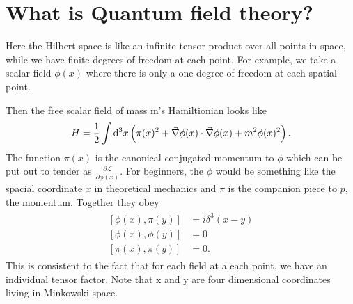 \section{What is Quantum field theory? \checkmark} \label{QFT}
	Here the Hilbert space is like an infinite tensor product over all points in space, while we have finite degrees of freedom at each point. 
For example, we take a scalar field $\phi(x)$ where there is only a one degree of freedom at each spatial point. 

	Then the free scalar field of mass m's Hamiltionian looks like
		\begin{equation}
			H=\frac{1}{2}\int \mathrm{d}^3 x \left(\pi(x)^2 + \vec{\nabla}\phi(x) \cdot \vec{\nabla}\phi(x) + m^2\phi(x)^2 \right).
		\end{equation}
	The function $\pi(x)$ is the canonical conjugated momentum to $\phi$ which can be put out to tender as $\frac{\partial \mathscr{L}}{\partial \dot{\phi}(x)}$. For beginners, the $\phi$ would be something like the spacial coordinate $x$ in theoretical mechanics and $\pi$ is the companion piece to $p$, the momentum.
	Together they obey
		\begin{align}
			\begin{split}
				[\phi(x),\pi(y)]&=i \delta^3(x-y) \\
				[\phi(x),\phi(y)]&=0 \\
				[\pi(x),\pi(y)]&=0.
			\end{split}
		\end{align}
	This is consistent to the fact that for each field at a each point, we have an individual tensor factor. Note that x and y are four dimensional coordinates living in Minkowski space.
			
